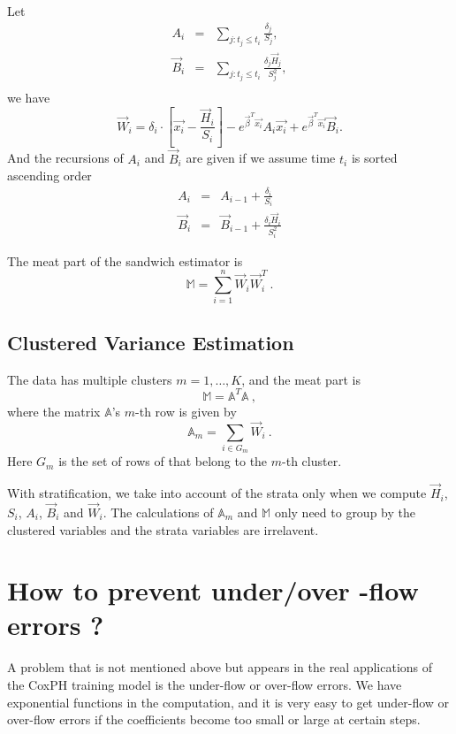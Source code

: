 Let
\begin{eqnarray*}
    A_i &=& \sum_{j: t_j \le t_i} \frac{\delta_j}{S_j},\\
    \vec{B}_i &=& \sum_{j: t_j \le t_i} \frac{\delta_j \vec{H}_j}{S_j^2},\\
\end{eqnarray*}
we have
\[
\vec{W}_i = \delta_i \cdot \left[ \vec{x_i} - \frac{\vec{H}_i}{S_i} \right] - e^{\vec{\beta}^T \vec{x_i}} A_i \vec{x_i} + e^{\vec{\beta}^T \vec{x_i}} \vec{B}_i.
\]
And the recursions of $A_i$ and $\vec{B}_i$ are given if we assume time $t_i$ is
sorted ascending order
\begin{eqnarray*}
    A_i &=& A_{i-1} + \frac{\delta_i}{S_i}\\
    \vec{B}_i &=& \vec{B}_{i-1} + \frac{\delta_i \vec{H}_i}{S_i^2}
\end{eqnarray*}

The meat part of the sandwich estimator is
\begin{equation}
  \mathbb{M} = \sum_{i=1}^n\vec{W}_i\vec{W}_i^T\ .
\end{equation}

\subsection{Clustered Variance Estimation}

The data has multiple clusters $m=1,\dots,K$, and the meat part is
\begin{equation}
  \mathbb{M} = \mathbb{A}^T\mathbb{A}\ ,
\end{equation}
where the matrix $\mathbb{A}$'s $m$-th row is given by
\begin{equation}
  \mathbb{A}_m = \sum_{i\in G_m} \vec{W}_i\ .
\end{equation}
Here $G_m$ is the set of rows of that belong to the $m$-th cluster.

With stratification, we take into account of the strata only when we
compute $\vec{H}_i$, $S_i$, $A_i$, $\vec{B}_i$ and $\vec{W}_i$. The
calculations of $\mathbb{A}_m$ and $\mathbb{M}$ only need to group by
the clustered variables and the strata variables are irrelavent.

\section{How to prevent under/over -flow errors ?}

A problem that is not mentioned above but appears in the real
applications of the CoxPH training model is the under-flow or
over-flow errors. We have exponential functions in the computation,
and it is very easy to get under-flow or over-flow errors if the
coefficients become too small or large at certain steps.

